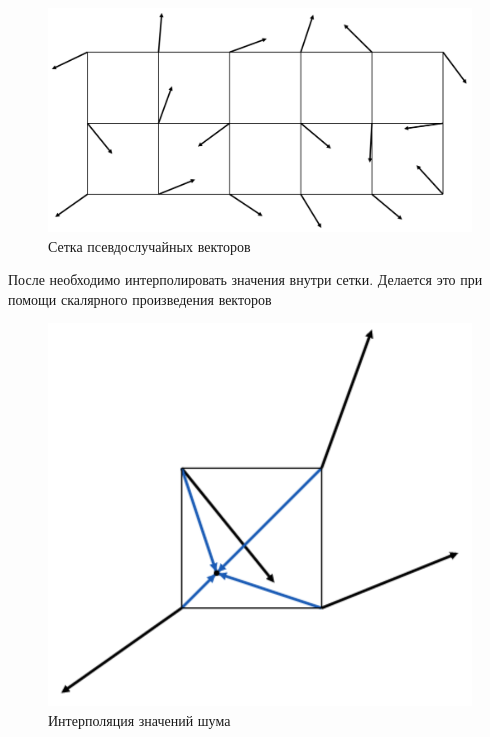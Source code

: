 \begin{figure}[H]
    \centering
    \includegraphics[scale=0.6]{img/vectors.png}
    \caption{Сетка псевдослучайных векторов}
    \label{img:vectors}
\end{figure}

После необходимо интерполировать значения внутри сетки. Делается это при помощи скалярного произведения векторов

\begin{figure}[H]
    \centering
    \includegraphics[scale=0.6]{img/interpolation.png}
    \caption{Интерполяция значений шума}
    \label{img:interpolation}
\end{figure}

